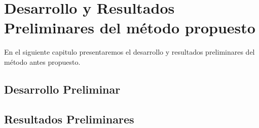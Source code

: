 \chapter{Desarrollo y Resultados Preliminares del método propuesto}


En el siguiente capitulo presentaremos el desarrollo y resultados preliminares del método antes propuesto.

\section{Desarrollo Preliminar}

\section{Resultados Preliminares}
